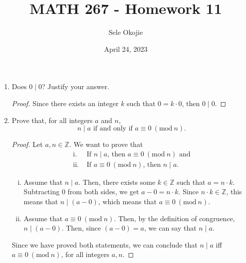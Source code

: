 \documentclass{article}
\title{MATH 267 - Homework 11}
\author{Sele Okojie}
\date{April 24, 2023}
\begin{document}
    \maketitle
    
    \begin{enumerate}

    	\item Does $0 \mid 0$?  Justify your answer.
                \begin{proof}
                    Since there exists an integer $k$ such that $0 = k \cdot 0$, then $0 \mid 0$.
                \end{proof}

    	\item Prove that, for all integers $a$ and $n$,
    		\[
    			n \mid a \text{ if and only if } a \equiv 0\ (\mathrm{mod}\ n).
    		\]
                \begin{proof}
                    Let $a, n\in\mathbb{Z}$. We want to prove that 
                    \begin{align*}
                        \text{i. }   & \text{If $n \mid a$, then $a \equiv 0\ (\mathrm{mod}\ n)$ and}  \\
                        \text{ii. }  & \text{If $a \equiv 0\ (\mathrm{mod}\ n)$, then $n \mid a$.}
                    \end{align*}
                                
                    \begin{enumerate}[i.]
                        \item Assume that $n \mid a$. Then, there exists some $k\in\mathbb{Z}$ such that $a = n\cdot k$. Subtracting $0$ from both sides, we get $a - 0 = n\cdot k$. Since $n\cdot k\in\mathbb{Z}$, this means that $n \mid (a - 0)$, which means that $a \equiv 0\ (\mathrm{mod}\  n)$. \\
                                    
                        \item Assume that $a \equiv 0\ (\mathrm{mod}\ n)$. Then, by the definition of congruence, $n \mid (a - 0)$. Then, since $(a - 0) = a$, we can say that $n \mid a$.
                    \end{enumerate}
                    Since we have proved both statements, we can conclude that $n \mid a$ iff $a \equiv 0\ (\mathrm{mod}\ n)$, for all integers $a, n$.
                \end{proof}


\end{enumerate}
\end{document}
